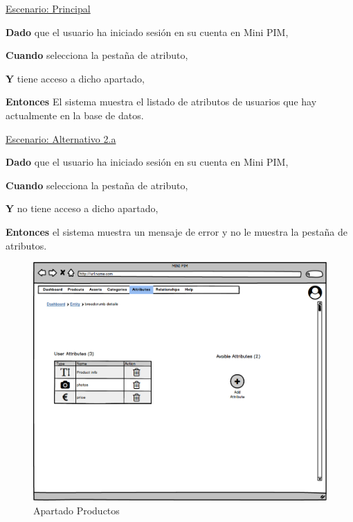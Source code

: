 \underline{Escenario: Principal}\par
\vspace{0.15cm}
\textbf{Dado} que el usuario ha iniciado sesión en su cuenta en Mini PIM,\par
\textbf{Cuando} selecciona la pestaña de atributo,\par
\textbf{Y} tiene acceso a dicho apartado,\par
\textbf{Entonces} El sistema muestra el listado de atributos de usuarios que hay actualmente en la base de datos.\par
\vspace{0.20cm}

\underline{Escenario: Alternativo 2.a}\par
\vspace{0.15cm}
\textbf{Dado} que el usuario ha iniciado sesión en su cuenta en Mini PIM,\par
\textbf{Cuando} selecciona la pestaña de atributo,\par
\textbf{Y} no tiene acceso a dicho apartado,\par
\textbf{Entonces} el sistema muestra un mensaje de error y no le muestra la pestaña de atributos.\par
\vspace{0.20cm}

\begin{figure}[H]
    \includegraphics[width=1\linewidth]{mockups/RF6_2 Leer Atributo.png}
    \caption{Apartado Productos}
   \end{figure}
\vspace{1.0cm}

